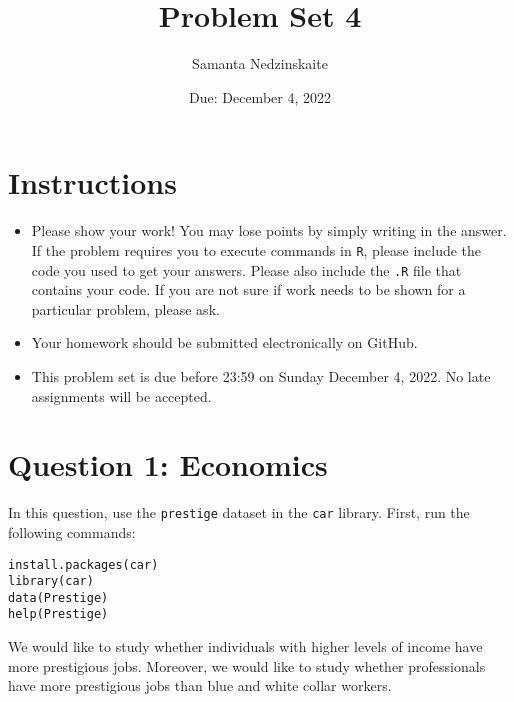 \documentclass[12pt,letterpaper]{article}
\title{Problem Set 4}
\date{Due: December 4, 2022}
\author{Samanta Nedzinskaite}
\begin{document}
	\maketitle
	\section*{Instructions}
	\begin{itemize}
		\item Please show your work! You may lose points by simply writing in the answer. If the problem requires you to execute commands in \texttt{R}, please include the code you used to get your answers. Please also include the \texttt{.R} file that contains your code. If you are not sure if work needs to be shown for a particular problem, please ask.
		\item Your homework should be submitted electronically on GitHub.
		\item This problem set is due before 23:59 on Sunday December 4, 2022. No late assignments will be accepted.
	\end{itemize}



	\vspace{.5cm}
\section*{Question 1: Economics}
\vspace{.25cm}
\noindent 	
In this question, use the \texttt{prestige} dataset in the \texttt{car} library. First, run the following commands:

\begin{verbatim}
install.packages(car)
library(car)
data(Prestige)
help(Prestige)
\end{verbatim} 


\noindent We would like to study whether individuals with higher levels of income have more prestigious jobs. Moreover, we would like to study whether professionals have more prestigious jobs than blue and white collar workers.
\end{document}
